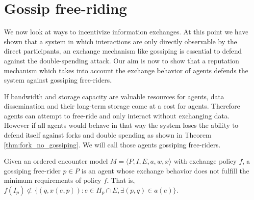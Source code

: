 \section{Gossip free-riding}
We now look at ways to incentivize information exchanges. At this point we have shown that a system in which 
interactions are only directly observable by the direct participants, an exchange mechanism like 
gossiping is essential to defend against the double-spending attack. 
Our aim is now to show that a reputation mechanism which takes into account the exchange behavior of 
agents defends the system against gossiping free-riders. 

If bandwidth and storage capacity are valuable resources for agents, data dissemination and their 
long-term storage come at a cost for agents. Therefore agents can attempt to free-ride and only 
interact without exchanging data. However if all agents would behave in that way the system loses 
the ability to defend itself against forks and double spending as shown in Theorem 
\ref{thm:fork_no_gossiping}. We will call those agents gossiping free-riders. 



\begin{defn}
    \label{def:gos_free-rider}
    Given an ordered encounter model $M = \langle P, I, E, a, w, x \rangle$ with exchange policy $f$, a gossiping free-rider $p \in P$ is an 
    agent whose exchange behavior does not fulfill the minimum requirements of policy $f$. That is, 
    $f(I_p) \nsubset \{ (q, x(e, p)) : e \in H_p \cap E, \exists (p, q) \in a(e)\}$.
\end{defn}

